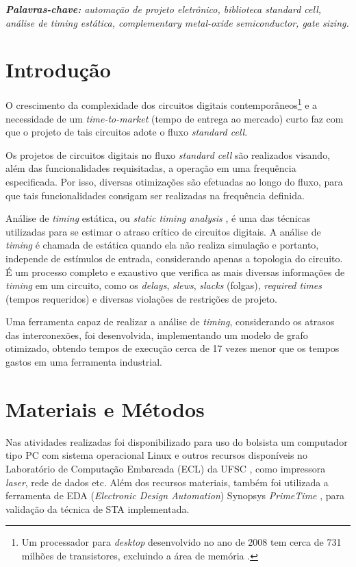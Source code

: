 \documentclass[
	12pt,				%
	openright,			%
	twoside,			%
	a4paper,			%
	english,			%
	french,				%
	spanish,			%
	brazil,				%
	]{abntex2}
\begin{document}
\begin{center}
\textit{\textbf{Palavras-chave:} automação de projeto eletrônico, biblioteca standard cell, análise de timing estática, complementary metal-oxide semiconductor, gate sizing.}
\end{center}

\section{Introdução}
O crescimento da complexidade dos circuitos digitais contemporâneos\footnote{Um processador para \textit{desktop} desenvolvido no ano de 2008 tem cerca de 731 milhões de transistores, excluindo a área de memória \cite{Intel08}.} e a necessidade de um \textit{time-to-market} (tempo de entrega ao mercado) curto faz com que o projeto de tais circuitos adote o fluxo \textit{standard cell}.

Os projetos de circuitos digitais no fluxo \textit{standard cell} são realizados visando, além das funcionalidades requisitadas, a operação em uma frequência especificada. Por isso, diversas otimizações são efetuadas ao longo do fluxo, para que tais funcionalidades consigam ser realizadas na frequência definida.

Análise de \textit{timing} estática, ou \textit{static timing analysis} \cite{Guntzel00} \cite{BhaskerChadha09}, é uma das técnicas utilizadas para se estimar o atraso crítico de circuitos digitais. A análise de \textit{timing} é chamada de estática quando ela não realiza simulação e portanto, independe de estímulos de entrada, considerando apenas a topologia do circuito. É um processo completo e exaustivo \cite{BhaskerChadha09} que verifica as mais diversas informações de \textit{timing} em um circuito, como os \textit{delays}, \textit{slews}, \textit{slacks} (folgas), \textit{required times} (tempos requeridos) e diversas violações de restrições de projeto.

Uma ferramenta capaz de realizar a análise de \textit{timing}, considerando os atrasos das interconexões, foi desenvolvida, implementando um modelo de grafo otimizado, obtendo tempos de execução cerca de 17 vezes menor que os tempos gastos em uma ferramenta industrial.


\section{Materiais e Métodos}

Nas atividades realizadas foi disponibilizado para uso do bolsista um computador tipo PC com sistema operacional Linux e outros recursos disponíveis no Laboratório de Computação Embarcada (ECL) da UFSC \cite{ECL}, como impressora \textit{laser}, rede de dados etc. Além dos recursos materiais, também foi utilizada a ferramenta de EDA (\textit{Electronic Design Automation}) Synopsys \textregistered \textit{PrimeTime} \texttrademark \cite{PrimeTime12}, para validação da técnica de STA implementada.
\end{document}

